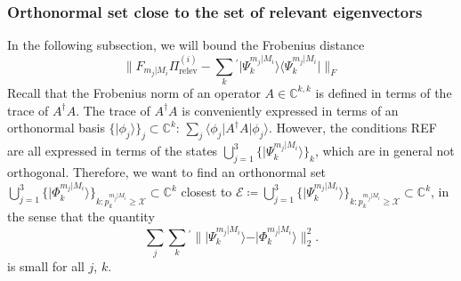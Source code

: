 \subsubsection{Orthonormal set close to the set of relevant eigenvectors}
In the following subsection, we will bound the Frobenius distance
\begin{equation}
\|F_{m_j\vert M_i}\Pi_{\text{relev}}^{(i)}-\sum_{k}{}^{'}\vert \Psi_k^{m_j\vert M_i}\rangle \langle \Psi_k^{m_j\vert M_i}\vert \|_F
\end{equation}
Recall that the Frobenius norm of an operator $A\in\mathbb{C}^{k,k}$ is defined in terms of the trace of $A^{\dag}A$. The trace of $A^{\dag}A$ is conveniently expressed in terms of an orthonormal basis $\{\vert \phi_j \rangle\}_j\subset \mathbb{C}^k$: $\sum_j \langle \phi_j \vert A^{\dag}A \vert \phi_j \rangle$. However, the conditions REF are all expressed in terms of the states $\bigcup\limits_{j=1}^3\{\vert \Psi_k^{m_j\vert M_i} \rangle\}_k$, which are in general not orthogonal. Therefore, we want to find an orthonormal set $\bigcup\limits_{j=1}^3\{\vert \Phi_k^{m_j\vert M_i}\rangle\}_{k:p_k^{m_j\vert M_i}\geq \mathcal{X}}\subset\mathbb{C}^k$ closest to $\mathcal{E}\coloneqq\bigcup\limits_{j=1}^3\{\vert \Psi_k^{m_j\vert M_i}\rangle\}_{k:p_k^{m_j\vert M_i}\geq \mathcal{X}}\subset\mathbb{C}^k$, in the sense that the quantity
\begin{equation}
\sum_{j}\sum_{k}{}^{'}\|\vert \Psi_k^{m_j\vert M_i} \rangle - \vert \Phi_k^{m_j\vert M_i} \rangle \|_2^2.
\end{equation}
is small for all $j$, $k$.

